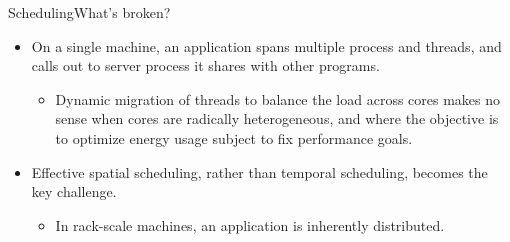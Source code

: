 \documentclass[10pt]{beamer}
\begin{document}
\begin{frame}{Scheduling}{What's broken?}
  \begin{itemize}
    \item On a single machine, an application spans multiple process and
      threads, and calls out to server process it shares with other
      programs. \pause
    \begin{itemize}
      \item Dynamic migration of threads to balance the load across
            cores makes no sense when cores are radically heterogeneous,
            and where the objective is to optimize energy usage subject
            to fix performance goals.
      \end{itemize} \pause
    \item Effective spatial scheduling, rather than temporal scheduling,
          becomes the key challenge. \pause
      \begin{itemize}
        \item In rack-scale machines, an application is inherently distributed.
      \end{itemize}
    \end{itemize}
\end{frame}

\end{document}
